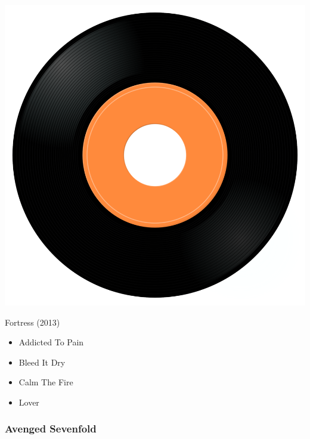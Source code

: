 \begin{minipage}[t]{0.25\textwidth}
\captionsetup{type=figure}
\includegraphics[width=\textwidth]{Images/cover.png}
\caption*{Fortress (2013)}
\end{minipage}
\begin{minipage}[t]{0.25\textwidth}\vspace{0pt}
\begin{itemize}[nosep,leftmargin=1em,labelwidth=*,align=left]
	\setlength{\itemsep}{0pt}
	\item Addicted To Pain
	\item Bleed It Dry
	\item Calm The Fire
	\item Lover
\end{itemize}
\end{minipage}

\subsubsection{Avenged Sevenfold}

